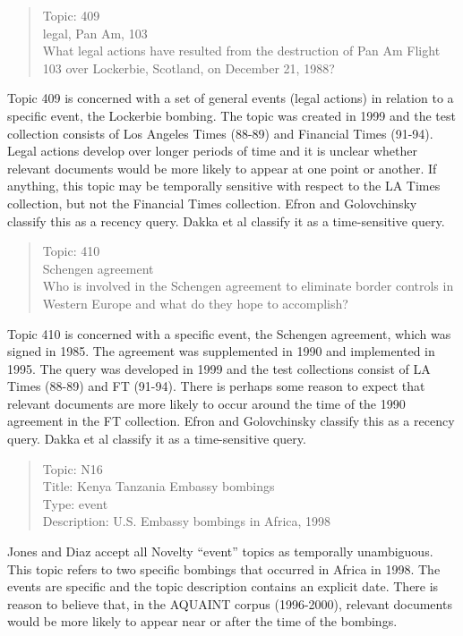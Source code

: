 \documentclass{sig-alternate}
\begin{document}
\begin{quote}
Topic: 409	\\
legal, Pan Am, 103 \\
What legal actions have resulted from the destruction of Pan Am Flight 103 over Lockerbie, Scotland, on December 21, 1988?  \\
\end{quote}

Topic 409 is concerned with a set of general events (legal actions) in relation to a specific event, the Lockerbie bombing. The topic was created in 1999 and the test collection consists of Los Angeles Times (88-89) and Financial Times (91-94). Legal actions develop over longer periods of time and it is unclear whether relevant documents would be more likely to appear at one point or another.  If anything, this topic may be temporally sensitive with respect to the LA Times collection, but not the Financial Times collection. Efron and Golovchinsky classify this as a recency query. Dakka et al classify it as a time-sensitive query.

\begin{quote}
Topic: 410 \\
Schengen agreement \\
Who is involved in the Schengen agreement to eliminate border controls in Western Europe and what do they hope to accomplish? \\
\end{quote}

Topic 410 is concerned with a specific event, the Schengen agreement, which was signed in 1985.  The agreement was supplemented in 1990 and implemented in 1995. The query was developed in 1999 and the test collections consist of LA Times (88-89) and FT (91-94).  There is perhaps some reason to expect that relevant documents are more likely to occur around the time of the 1990 agreement in the FT collection.  Efron and Golovchinsky classify this as a recency query. Dakka et al classify it as a time-sensitive query.

\begin{quote}
Topic: N16 \\
Title: Kenya Tanzania Embassy bombings \\
Type: event \\
Description: U.S. Embassy bombings in Africa, 1998 \\
\end{quote}

Jones and Diaz accept all Novelty ``event'' topics as temporally unambiguous. This topic refers to two specific bombings that occurred in Africa in 1998. The events are specific and the topic description contains an explicit date.  There is reason to believe that, in the AQUAINT corpus (1996-2000), relevant documents would be more likely to appear near or after the time of the bombings.
\end{document}
